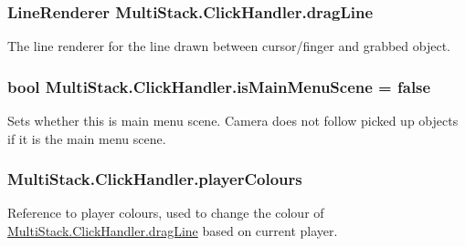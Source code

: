 \hypertarget{class_multi_stack_1_1_click_handler_a7d28187d20185f4b352669cbd072b3b5}{}
\subsubsection[{drag\+Line}]{\setlength{\rightskip}{0pt plus 5cm}Line\+Renderer Multi\+Stack.\+Click\+Handler.\+drag\+Line}\label{class_multi_stack_1_1_click_handler_a7d28187d20185f4b352669cbd072b3b5}


The line renderer for the line drawn between cursor/finger and grabbed object. 

\hypertarget{class_multi_stack_1_1_click_handler_a2e0855046aafb6f87b298c83de1c82f5}{}
\subsubsection[{is\+Main\+Menu\+Scene}]{\setlength{\rightskip}{0pt plus 5cm}bool Multi\+Stack.\+Click\+Handler.\+is\+Main\+Menu\+Scene = false}\label{class_multi_stack_1_1_click_handler_a2e0855046aafb6f87b298c83de1c82f5}


Sets whether this is main menu scene. Camera does not follow picked up objects if it is the main menu scene. 

\hypertarget{class_multi_stack_1_1_click_handler_a02d956303c6e5a958379602f9103add7}{}
\subsubsection[{player\+Colours}]{ Multi\+Stack.\+Click\+Handler.\+player\+Colours}\label{class_multi_stack_1_1_click_handler_a02d956303c6e5a958379602f9103add7}


Reference to player colours, used to change the colour of \hyperlink{class_multi_stack_1_1_click_handler_a7d28187d20185f4b352669cbd072b3b5}{Multi\+Stack.\+Click\+Handler.\+drag\+Line} based on current player. 



